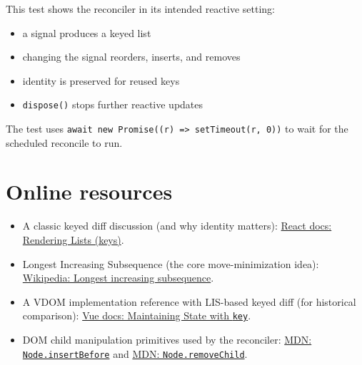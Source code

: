 This test shows the reconciler in its intended reactive setting:

\begin{itemize}
  \item a signal produces a keyed list
  \item changing the signal reorders, inserts, and removes
  \item identity is preserved for reused keys
  \item \texttt{dispose()} stops further reactive updates
\end{itemize}

The test uses \texttt{await new Promise((r) => setTimeout(r, 0))} to wait for the scheduled reconcile to run.

\section{Online resources}

\begin{itemize}
  \item A classic keyed diff discussion (and why identity matters):
  \href{https://react.dev/learn/rendering-lists}{React docs: Rendering Lists (keys)}.
  \item Longest Increasing Subsequence (the core move-minimization idea):
  \href{https://en.wikipedia.org/wiki/Longest_increasing_subsequence}{Wikipedia: Longest increasing subsequence}.
  \item A VDOM implementation reference with LIS-based keyed diff (for historical comparison):
  \href{https://vuejs.org/guide/essentials/list.html#maintaining-state-with-key}{Vue docs: Maintaining State with \texttt{key}}.
  \item DOM child manipulation primitives used by the reconciler:
  \href{https://developer.mozilla.org/en-US/docs/Web/API/Node/insertBefore}{MDN: \texttt{Node.insertBefore}} and
  \href{https://developer.mozilla.org/en-US/docs/Web/API/Node/removeChild}{MDN: \texttt{Node.removeChild}}.
\end{itemize}
